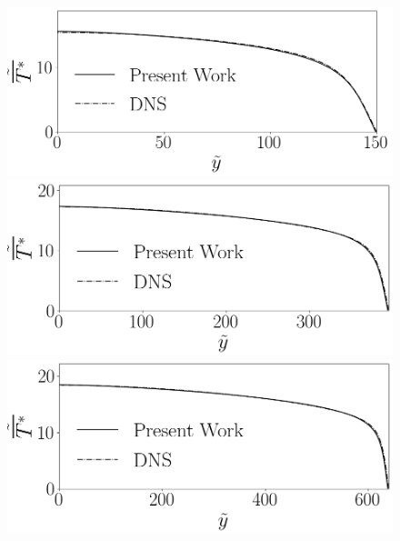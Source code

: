 \begin{figure}[!h]
	\centering
	\begin{minipage}[t]{0.5\textwidth}
		\centering
		\includegraphics[angle=0, scale=0.24]{fotos_formatacao_final/Temperature_150_071_Genetic2temperature}
	\end{minipage}
	\begin{minipage}[t]{0.45\textwidth}
		\centering
		\includegraphics[angle=0, scale=0.24]{fotos_formatacao_final/Temperature_395_071_Genetic2temperature}
	\end{minipage}
	\begin{minipage}[t]{0.5\textwidth}
		\centering
		\includegraphics[angle=0, scale=0.24]{fotos_formatacao_final/Temperature_640_071_Genetic2temperature}

\end{minipage}
\end{figure}
